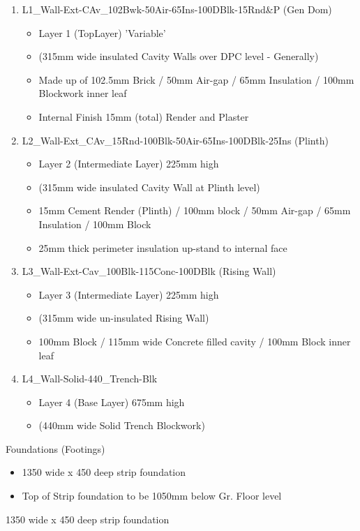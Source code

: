 \begin{enumerate}
	\item L1\_Wall-Ext-CAv\_102Bwk-50Air-65Ins-100DBlk-15Rnd\&P (Gen Dom)
	\begin{itemize}
		\item Layer 1 (TopLayer) 'Variable'
		\item (315mm wide insulated Cavity Walls over DPC level - Generally)
		\item Made up of 102.5mm Brick / 50mm Air-gap / 65mm Insulation / 100mm Blockwork inner leaf
		\item Internal Finish 15mm (total) Render and Plaster
	\end{itemize}
	
	\item L2\_Wall-Ext\_CAv\_15Rnd-100Blk-50Air-65Ins-100DBlk-25Ins (Plinth)
	\begin{itemize}
		\item Layer 2 (Intermediate Layer) 225mm high
		\item (315mm wide insulated Cavity Wall at Plinth level)
		\item 15mm Cement Render (Plinth) / 100mm block / 50mm Air-gap / 65mm Insulation / 100mm Block
		\item 25mm thick perimeter insulation up-stand to internal face
	\end{itemize}
	
	
	\item L3\_Wall-Ext-Cav\_100Blk-115Conc-100DBlk (Rising Wall)
	\begin{itemize}
		\item Layer 3 (Intermediate Layer) 225mm high
		\item (315mm wide un-insulated Rising Wall)
		\item 100mm Block / 115mm wide Concrete filled cavity / 100mm Block inner leaf
	\end{itemize}
	
	
	\item L4\_Wall-Solid-440\_Trench-Blk
	\begin{itemize}
		\item Layer 4 (Base Layer) 675mm high
		\item (440mm wide Solid Trench Blockwork)
	\end{itemize}
\end{enumerate}

Foundations (Footings)

\begin{itemize}
	\item 1350 wide x 450 deep strip foundation
	\item Top of Strip foundation to be 1050mm below Gr. Floor level
\end{itemize}
1350 wide x 450 deep strip foundation


